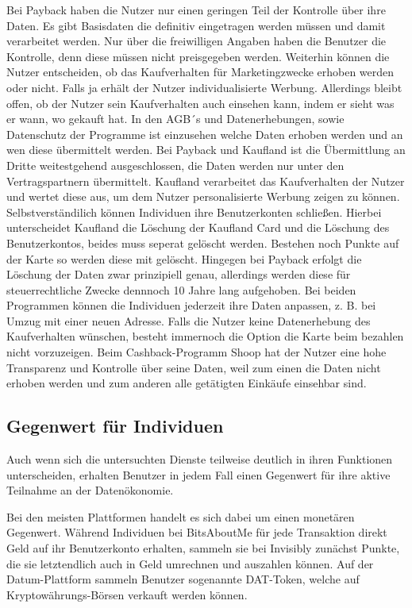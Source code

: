 \noindent Bei Payback haben die Nutzer nur einen geringen Teil der Kontrolle über ihre Daten. Es gibt Basisdaten die definitiv eingetragen werden müssen und damit verarbeitet werden. Nur über die freiwilligen Angaben haben die Benutzer die Kontrolle, denn diese müssen nicht preisgegeben werden. Weiterhin können die Nutzer entscheiden, ob das Kaufverhalten für Marketingzwecke erhoben werden oder nicht. Falls ja erhält der Nutzer individualisierte Werbung. Allerdings bleibt offen, ob der Nutzer sein Kaufverhalten auch einsehen kann, indem er sieht was er wann, wo gekauft hat. In den AGB´s und Datenerhebungen, sowie Datenschutz der Programme ist einzusehen welche Daten erhoben werden und an wen diese übermittelt werden. Bei Payback und Kaufland ist die Übermittlung an Dritte weitestgehend ausgeschlossen, die Daten werden nur unter den Vertragspartnern übermittelt.
Kaufland verarbeitet das Kaufverhalten der Nutzer und wertet diese aus, um dem Nutzer personalisierte Werbung zeigen zu können. Selbstverständilich können Individuen ihre Benutzerkonten schließen. Hierbei unterscheidet Kaufland die Löschung der Kaufland Card und die Löschung des Benutzerkontos, beides muss seperat gelöscht werden. Bestehen noch Punkte auf der Karte so werden diese mit gelöscht. Hingegen bei Payback erfolgt die Löschung der Daten zwar prinzipiell genau, allerdings werden diese für steuerrechtliche Zwecke dennnoch 10 Jahre lang aufgehoben. Bei beiden Programmen können die Individuen jederzeit ihre Daten anpassen, z. B. bei Umzug mit einer neuen Adresse. Falls die Nutzer keine Datenerhebung des Kaufverhalten wünschen, besteht immernoch die Option die Karte beim bezahlen nicht vorzuzeigen.
Beim Cashback-Programm Shoop hat der Nutzer eine hohe Transparenz und Kontrolle über seine Daten, weil zum einen die Daten nicht erhoben werden und zum anderen alle getätigten Einkäufe einsehbar sind.

\subsection{Gegenwert für Individuen}
Auch wenn sich die untersuchten Dienste teilweise deutlich in ihren Funktionen unterscheiden, erhalten Benutzer in jedem Fall einen Gegenwert für ihre aktive Teilnahme an der Datenökonomie. \newline

\noindent Bei den meisten Plattformen handelt es sich dabei um einen monetären Gegenwert. Während Individuen bei BitsAboutMe für jede Transaktion direkt Geld auf ihr Benutzerkonto erhalten, sammeln sie bei Invisibly zunächst Punkte, die sie letztendlich auch in Geld umrechnen und auszahlen können. Auf der Datum-Plattform sammeln Benutzer sogenannte DAT-Token, welche auf Kryptowährungs-Börsen verkauft werden können. \newline

